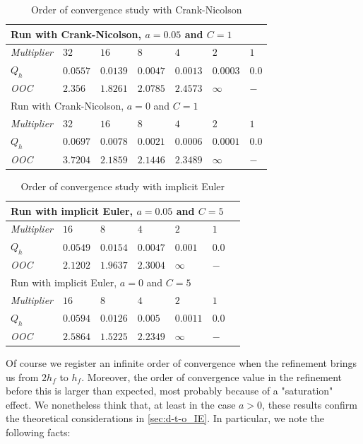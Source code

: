 \documentclass[english,a4paper,9pt,oneside]{scrbook}	%
\theoremstyle{break}
\theoremstyle{remark}
\begin{document}
\begin{table}[h]
\centering
\begin{tabular}{lllllll}
\hline
\multicolumn{7}{l}{Run with Crank-Nicolson, $a = 0.05$ and $C = 1$} \\ \hline
\textit{Multiplier} & $32$ & $16$ & $8$ & $4$ & $2$ & $1$\\ \hline
$Q_h$ & $0.0557$ & $0.0139$ & $0.0047$ & $0.0013$ & $0.0003$ & $0.0$\\ \hline
\textit{OOC} & $2.356$ & $1.8261$ & $2.0785$ & $2.4573$ & $\infty$ & $-$ \\ \hline
\hline
\multicolumn{7}{l}{Run with Crank-Nicolson, $a = 0$ and $C=1$} \\ \hline
\textit{Multiplier} & $32$ & $16$ & $8$ & $4$ & $2$ & $1$\\ \hline
$Q_h$ & $0.0697$ & $0.0078$ & $0.0021$ & $0.0006$ & $0.0001$ & $0.0$\\ \hline
\textit{OOC} & $3.7204$ & $2.1859$ & $2.1446$ & $2.3489$ & $\infty$ & $-$ \\ \hline
\end{tabular}
\caption{Order of convergence study with Crank-Nicolson}\label{tab:ooc_CN}
\end{table}


\begin{table}[h]
\centering
\begin{tabular}{lllllll}
\hline
\multicolumn{6}{l}{Run with implicit Euler, $a = 0.05$ and $C=5$} \\ \hline
\textit{Multiplier} & $16$ & $8$ & $4$ & $2$ & $1$\\ \hline
$Q_h$ & $0.0549$ & $0.0154$ & $0.0047$ & $0.001$ & $0.0$\\ \hline
\textit{OOC} & $2.1202$ & $1.9637$ & $2.3004$ & $\infty$ & $-$ \\ \hline
\hline
\multicolumn{6}{l}{Run with implicit Euler, $a = 0$ and $C=5$} \\ \hline
\textit{Multiplier} & $16$ & $8$ & $4$ & $2$ & $1$\\ \hline
$Q_h$ & $0.0594$ & $0.0126$ & $0.005$ & $0.0011$ & $0.0$\\ \hline
\textit{OOC} & $2.5864$ & $1.5225$ & $2.2349$ & $\infty$ & $-$ \\ \hline
\end{tabular}
\caption{Order of convergence study with implicit Euler}\label{tab:ooc_IE}
\end{table}

Of course we register an infinite order of convergence when the refinement brings us from $2h_f$ to $h_f$. Moreover, the order of convergence value in the refinement before this is larger than expected, most probably because of a "saturation" effect. We nonetheless think that, at least in the case $a>0$, these results confirm the theoretical considerations in  \cref{sec:d-t-o_IE}. In particular, we note the following facts:
\end{document}
